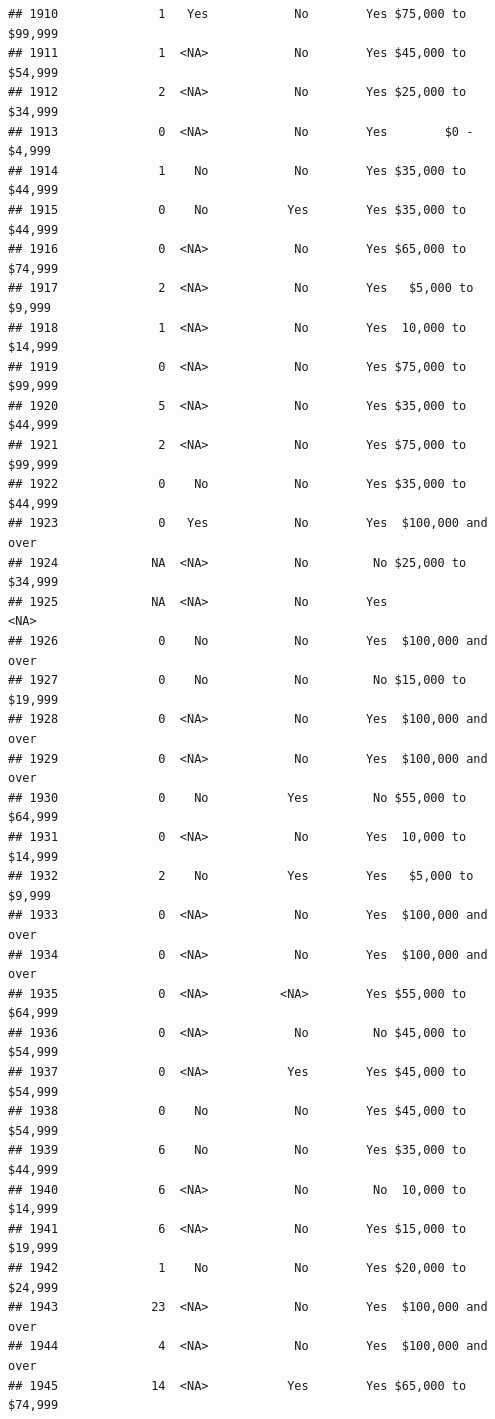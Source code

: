 \documentclass[man]{apa6}
\begin{document}
\begin{verbatim}
## 1910              1   Yes            No        Yes $75,000 to $99,999
## 1911              1  <NA>            No        Yes $45,000 to $54,999
## 1912              2  <NA>            No        Yes $25,000 to $34,999
## 1913              0  <NA>            No        Yes        $0 - $4,999
## 1914              1    No            No        Yes $35,000 to $44,999
## 1915              0    No           Yes        Yes $35,000 to $44,999
## 1916              0  <NA>            No        Yes $65,000 to $74,999
## 1917              2  <NA>            No        Yes   $5,000 to $9,999
## 1918              1  <NA>            No        Yes  10,000 to $14,999
## 1919              0  <NA>            No        Yes $75,000 to $99,999
## 1920              5  <NA>            No        Yes $35,000 to $44,999
## 1921              2  <NA>            No        Yes $75,000 to $99,999
## 1922              0    No            No        Yes $35,000 to $44,999
## 1923              0   Yes            No        Yes  $100,000 and over
## 1924             NA  <NA>            No         No $25,000 to $34,999
## 1925             NA  <NA>            No        Yes               <NA>
## 1926              0    No            No        Yes  $100,000 and over
## 1927              0    No            No         No $15,000 to $19,999
## 1928              0  <NA>            No        Yes  $100,000 and over
## 1929              0  <NA>            No        Yes  $100,000 and over
## 1930              0    No           Yes         No $55,000 to $64,999
## 1931              0  <NA>            No        Yes  10,000 to $14,999
## 1932              2    No           Yes        Yes   $5,000 to $9,999
## 1933              0  <NA>            No        Yes  $100,000 and over
## 1934              0  <NA>            No        Yes  $100,000 and over
## 1935              0  <NA>          <NA>        Yes $55,000 to $64,999
## 1936              0  <NA>            No         No $45,000 to $54,999
## 1937              0  <NA>           Yes        Yes $45,000 to $54,999
## 1938              0    No            No        Yes $45,000 to $54,999
## 1939              6    No            No        Yes $35,000 to $44,999
## 1940              6  <NA>            No         No  10,000 to $14,999
## 1941              6  <NA>            No        Yes $15,000 to $19,999
## 1942              1    No            No        Yes $20,000 to $24,999
## 1943             23  <NA>            No        Yes  $100,000 and over
## 1944              4  <NA>            No        Yes  $100,000 and over
## 1945             14  <NA>           Yes        Yes $65,000 to $74,999

\end{verbatim}
\end{document}
